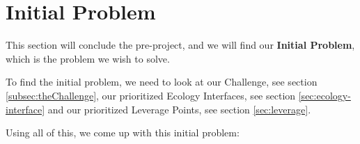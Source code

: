 \section{Initial Problem}
This section will conclude the pre-project, and we will find our \textbf{Initial Problem}, which is the problem we wish to solve.

To find the initial problem, we need to look at our Challenge, see section \ref{subsec:theChallenge}, our prioritized Ecology Interfaces, see section \ref{sec:ecology-interface} and our prioritized Leverage Points, see section \ref{sec:leverage}.

Using all of this, we come up with this initial problem:

\noindent\hrulefill\par
\noindent{} \\



